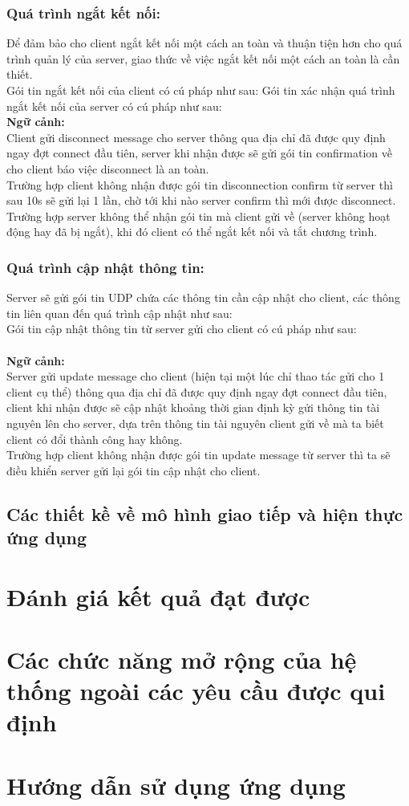 \documentclass[a4paper,11pt]{extarticle}
\begin{document}
\subsubsection{Quá trình ngắt kết nối:}
Để đảm bảo cho client ngắt kết nối một cách an toàn và thuận tiện hơn cho quá trình quản lý của server, giao thức về việc ngắt kết nối một cách an toàn là cần thiết. \\
Gói tin ngắt kết nối của client có cú pháp như sau:
Gói tin xác nhận quá trình ngắt kết nối của server có cú pháp như sau:   \\
\textbf{Ngữ cảnh:} \\
Client gửi disconnect message cho server thông qua địa chỉ đã được quy định ngay đợt connect đầu tiên, server khi nhận được sẽ gửi gói tin confirmation về cho client báo việc disconnect là an toàn. \\
Trường hợp client không nhận được gói tin disconnection confirm từ server thì sau 10s sẽ gửi lại 1 lần, chờ tới khi nào server confirm thì mới được disconnect. \\
Trường hợp server không thể nhận gói tin mà client gửi về (server không hoạt động hay đã bị ngắt), khi đó client có thể ngắt kết nối và tắt chương trình.

\subsubsection{Quá trình cập nhật thông tin:}
Server sẽ gửi gói tin UDP chứa các thông tin cần cập nhật cho client, các thông tin liên quan đến quá trình cập nhật như sau: \\
Gói tin cập nhật thông tin từ server gửi cho client có cú pháp như sau: \\
 \\
\textbf{Ngữ cảnh:} \\
Server gửi update message cho client (hiện tại một lúc chỉ thao tác gửi cho 1 client cụ thể) thông qua địa chỉ đã được quy định ngay đợt connect đầu tiên, client khi nhận được sẽ cập nhật khoảng thời gian định kỳ gửi thông tin tài nguyên lên cho server, dựa trên thông tin tài nguyên client gửi về mà ta biết client có đổi thành công hay không. \\
Trường hợp client không nhận được gói tin update message từ server thì ta sẽ điều khiển server gửi lại gói tin cập nhật cho client.

\subsection {Các thiết kề về mô hình giao tiếp và hiện thực ứng dụng}
\section{Đánh giá kết quả đạt được}
\section{Các chức năng mở rộng của hệ thống ngoài các yêu cầu được qui định}
\section{Hướng dẫn sử dụng ứng dụng}
\end{document}
